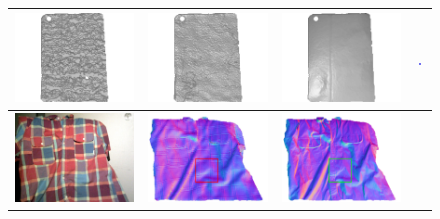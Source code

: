 \begin{figure}[!ht]
{\begin{tabular}{c|c c c}
   \includegraphics[height = 0.20\linewidth]{figures/result/robust_padback_shape_init.pdf} 
   &
   \includegraphics[height = 0.20\linewidth]{figures/result/rgbd_padback_shape.pdf} &
   \includegraphics[height = 0.20\linewidth]{figures/result/robust_padback_shape.pdf} &
      \includegraphics[width=0.16\textwidth]{figures/result/robust_padback_normal_crop.png} 
   \\
\hline
   \includegraphics[height = 0.20\linewidth]{figures/result/robust_patternShirt_rgb.pdf} 
   &
   \includegraphics[height = 0.20\linewidth]{figures/result/rgbd_patternShirt_normal_detail.pdf} &
   \includegraphics[height = 0.20\linewidth]{figures/result/robust_patternShirt_normal_detail.pdf}&

\end{tabular}}
\end{figure}
